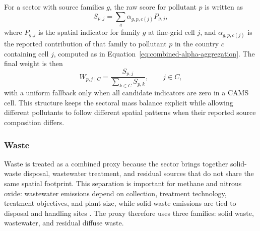 For a sector with source families $g$, the raw score for pollutant $p$ is
written as
\begin{equation}
  S_{p,j} =
  \sum_g \alpha_{g,p,c(j)} P_{g,j},
  \label{eq:combined-sector-score}
\end{equation}
where $P_{g,j}$ is the spatial indicator for family $g$ at fine-grid
cell $j$, and $\alpha_{g,p,c(j)}$ is the reported contribution of that
family to pollutant $p$ in the country $c$ containing cell $j$, computed
as in Equation~\ref{eq:combined-alpha-aggregation}. The final weight is then
\begin{equation}
  W_{p,j \mid C} =
  \frac{S_{p,j}}{\sum_{k \in C} S_{p,k}},
  \qquad j \in C ,
  \label{eq:combined-sector-normalisation}
\end{equation}
with a uniform fallback only when all candidate indicators are zero in a
CAMS cell. This structure keeps the sectoral mass balance explicit while
allowing different pollutants to follow different spatial patterns when
their reported source composition differs.

\subsubsection{Waste}
\label{sec:combined-waste}

Waste is treated as a combined proxy because the sector brings together
solid-waste disposal, wastewater treatment, and residual sources that do
not share the same spatial footprint. This separation is important for
methane and nitrous oxide: wastewater emissions depend on collection,
treatment technology, treatment objectives, and plant size, while
solid-waste emissions are tied to disposal and handling sites
\citep{moore_naturewater2025,Song2024WastewaterNetZero}. The proxy
therefore uses three families: solid waste, wastewater, and residual
diffuse waste.

